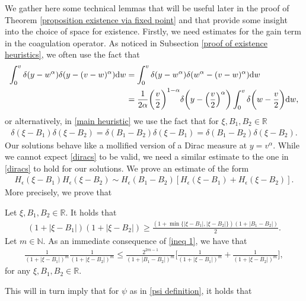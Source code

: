 \documentclass[11pt]{article}
\numberwithin{equation}{section}
\newcommand{\der}{\textup{d}}
\begin{document}
We gather here some technical lemmas that will be useful later in the proof of Theorem \ref{proposition existence via fixed point} and that provide some insight into the choice of space for existence. Firstly, we need estimates for the gain term in the coagulation operator. As noticed in Subsection \ref{proof of existence heuristics}, we often use the fact that
\begin{align}
\int_{0}^{v}\delta(y-w^{\alpha})\delta(y-(v-w)^{\alpha})\der w&=\int_{0}^{v}\delta(y-w^{\alpha})\delta(w^{\alpha}-(v-w)^{\alpha})\der w\label{main heuristic}\\
&=\frac{1}{2\alpha} \bigg(\frac{v}{2}\bigg)^{1-\alpha}\delta\bigg(y-\Big(\frac{v}{2}\Big)^{\alpha}\bigg)\int_{0}^{v}\delta\bigg(w-\frac{v}{2}\bigg)\der w,\label{main heuristic 2}
\end{align}or alternatively, in \eqref{main heuristic} we use the fact that for $\xi,B_{1},B_{2}\in\mathbb{R}$
\begin{align}\label{diracs}
    \delta(\xi-B_{1}) \delta(\xi-B_{2})= \delta(B_{1}-B_{2}) \delta(\xi-B_{1})= \delta(B_{1}-B_{2}) \delta(\xi-B_{2}).
\end{align}
Our solutions behave like a mollified version of a Dirac measure at $y=v^{\alpha}$. While we cannot expect \eqref{diracs} to be valid, we need a similar estimate to the one in \eqref{diracs} to hold for our solutions. We prove an estimate of the form
\begin{align*}
    H_{\epsilon}(\xi-B_{1}) H_{\epsilon}(\xi-B_{2})\sim H_{\epsilon}(B_{1}-B_{2}) [H_{\epsilon}(\xi-B_{1})+H_{\epsilon}(\xi-B_{2})].
\end{align*}
More precisely, we prove that
\begin{lem}\label{lemma dirac convolution}
Let $\xi,B_{1},B_{2}\in\mathbb{R}$. It holds that 
\begin{align}\label{ineq 1}
       (1+|\xi-B_{1}|)(1+|\xi-B_{2}|)\geq \frac{(1+\min\{|\xi-B_{1}|,|\xi-B_{2}|\})(1+|B_{1}-B_{2}|)}{2}.
\end{align}
Let $m\in\mathbb{N}$. As an immediate consequence of \eqref{ineq 1}, we have that
    \begin{align}\label{ineq 2}
        \frac{1}{(1+|\xi-B_{1}|)^{m}} \frac{1}{(1+|\xi-B_{2}|)^{m}}\leq \frac{2^{2m-1}}{(1+|B_{1}-B_{2}|)^{m}}\bigg[\frac{1}{(1+|\xi-B_{1}|)^{m}} +\frac{1}{(1+|\xi-B_{2}|)^{m}}\bigg],
    \end{align}
    for any $\xi,B_{1},B_{2}\in\mathbb{R}$.
\end{lem}
This will in turn imply that for $\psi$ as in \eqref{psi definition}, it holds that
\end{document}
